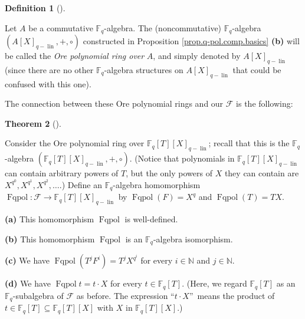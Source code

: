 \documentclass[numbers=enddot,12pt,final,onecolumn,notitlepage]{scrartcl}%
\theoremstyle{definition}
\newtheorem{theo}{Theorem}[section]
\newenvironment{theorem}[1][]
{\begin{theo}[#1]\begin{leftbar}}
{\end{leftbar}\end{theo}}
\newtheorem{defi}[theo]{Definition}
\newenvironment{definition}[1][]
{\begin{defi}[#1]\begin{leftbar}}
{\end{leftbar}\end{defi}}
\begin{document}
\begin{definition}
\label{def.q-pol.ring}Let $A$ be a commutative $\mathbb{F}_{q}$-algebra. The
(noncommutative) $\mathbb{F}_{q}$-algebra $\left(  A\left[  X\right]
_{q-\operatorname*{lin}},+,\circ\right)  $ constructed in Proposition
\ref{prop.q-pol.comp.basics} \textbf{(b)} will be called the \textit{Ore
polynomial ring over }$A$, and simply denoted by $A\left[  X\right]
_{q-\operatorname*{lin}}$ (since there are no other $\mathbb{F}_{q}$-algebra
structures on $A\left[  X\right]  _{q-\operatorname*{lin}}$ that could be
confused with this one).
\end{definition}

The connection between these Ore polynomial rings and our $\mathcal{F}$ is the following:

\begin{theorem}
\label{thm.q-pol.=F}Consider the Ore polynomial ring over $\mathbb{F}%
_{q}\left[  T\right]  \left[  X\right]  _{q-\operatorname*{lin}}$; recall that
this is the $\mathbb{F}_{q}$-algebra $\left(  \mathbb{F}_{q}\left[  T\right]
\left[  X\right]  _{q-\operatorname*{lin}},+,\circ\right)  $. (Notice that
polynomials in $\mathbb{F}_{q}\left[  T\right]  \left[  X\right]
_{q-\operatorname*{lin}}$ can contain arbitrary powers of $T$, but the only
powers of $X$ they can contain are $X^{q^{0}},X^{q^{1}},X^{q^{2}},\ldots$.)
Define an $\mathbb{F}_{q}$-algebra homomorphism $\operatorname*{Fqpol}%
:\mathcal{F}\rightarrow\mathbb{F}_{q}\left[  T\right]  \left[  X\right]
_{q-\operatorname*{lin}}$ by $\operatorname*{Fqpol}\left(  F\right)  =X^{q}$
and $\operatorname*{Fqpol}\left(  T\right)  =TX$.

\textbf{(a)} This homomorphism $\operatorname*{Fqpol}$ is well-defined.

\textbf{(b)} This homomorphism $\operatorname*{Fqpol}$ is an $\mathbb{F}_{q}%
$-algebra isomorphism.

\textbf{(c)} We have $\operatorname*{Fqpol}\left(  T^{j}F^{i}\right)
=T^{j}X^{q^{i}}$ for every $i\in\mathbb{N}$ and $j\in\mathbb{N}$.

\textbf{(d)} We have $\operatorname*{Fqpol}t=t\cdot X$ for every
$t\in\mathbb{F}_{q}\left[  T\right]  $. (Here, we regard $\mathbb{F}%
_{q}\left[  T\right]  $ as an $\mathbb{F}_{q}$-subalgebra of $\mathcal{F}$ as
before. The expression \textquotedblleft$t\cdot X$\textquotedblright\ means
the product of $t\in\mathbb{F}_{q}\left[  T\right]  \subseteq\mathbb{F}%
_{q}\left[  T\right]  \left[  X\right]  $ with $X$ in $\mathbb{F}_{q}\left[
T\right]  \left[  X\right]  $.)
\end{theorem}
\end{document}
